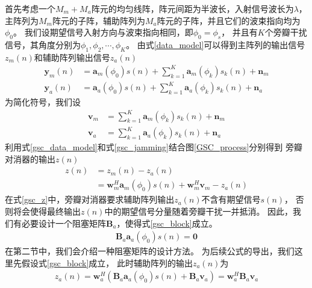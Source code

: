 \documentclass[master]{thesis-uestc}
\begin{document}
首先考虑一个$M_m+M_a$阵元的均匀线阵，阵元间距为半波长，入射信号波长为$\lambda$，
主阵列为$M_m$阵元的子阵，辅助阵列为$M_a$阵元的子阵，并且它们的波束指向均为$\phi_0$。
我们设期望信号入射方向与波束指向相同，即$\phi_0=\phi_s$，
并且有$K$个旁瓣干扰信号，其角度分别为$\phi_1,\phi_2,\cdots,\phi_K$。
由式\eqref{data_model}可以得到主阵列的输出信号$z_m(n)$和辅助阵列输出信号$z_a(n)$
\begin{subequations}\label{gsc_data_model}
    \begin{align}
        \bm{y}_m(n) &= \bm{a}_m(\phi_0)s(n) + 
                       \sum_{k=1}^{K}\bm{a}_m(\phi_k)s_k(n) + \bm{n}_m
        \\
        \bm{y}_a(n) &= \bm{a}_a(\phi_0)s(n) + 
                       \sum_{k=1}^{K}\bm{a}_a(\phi_k)s_k(n) + \bm{n}_a
    \end{align}
\end{subequations}
为简化符号，我们设
\begin{subequations}\label{gsc_jamming}
    \begin{align}
        \bm{v}_m &= \sum_{k=1}^{K}\bm{a}_m(\phi_k)s_k(n) + \bm{n}_m
        \\
        \bm{v}_a &= \sum_{k=1}^{K}\bm{a}_a(\phi_k)s_k(n) + \bm{n}_a
    \end{align}
\end{subequations}
利用式\eqref{gsc_data_model}和式\eqref{gsc_jamming}结合图\ref{GSC_process}分别得到
旁瓣对消器的输出$z(n)$
\begin{equation}\label{gsc_z}
    \begin{aligned}
        z(n) &= z_m(n) - z_a(n)
        \\
             &= \bm{w}^H_m\bm{a}_m(\phi_0)s(n) + \bm{w}^H_m\bm{v}_m - z_a(n)
    \end{aligned}
\end{equation}
在式\eqref{gsc_z}中，旁瓣对消器要求辅助阵列输出$z_a(n)$不含有期望信号$s(n)$，
否则将会使得最终输出$z(n)$中的期望信号分量随着旁瓣干扰一并抵消。
因此，我们有必要设计一个阻塞矩阵$\bm{B}_a$，使得式\eqref{gsc_block}成立。
\begin{equation}\label{gsc_block}
    \begin{aligned}
        \bm{B}_a\bm{a}_a(\phi_0)s(n) = \textbf{0}
    \end{aligned}
\end{equation}
在第二节中，我们会介绍一种阻塞矩阵的设计方法。
为后续公式的导出，我们这里先假设式\eqref{gsc_block}成立，
此时辅助阵列的输出$z_a(n)$为
\begin{equation}\label{gsc_z_a}
    \begin{aligned}
        z_a(n) = \bm{w}_a^H\left(\bm{B}_a\bm{a}_a(\phi_0)s(n) + \bm{B}_a\bm{v}_a\right)
               = \bm{w}_a^H\bm{B}_a\bm{v}_a
    \end{aligned}
\end{equation}
\end{document}
